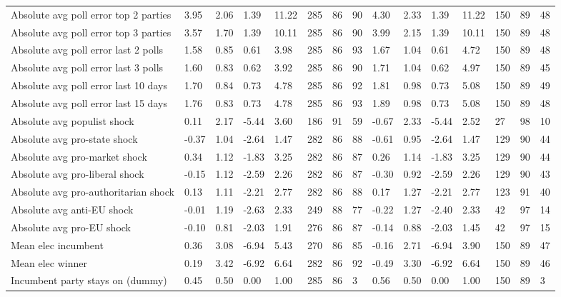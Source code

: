 \begin{longtable}{lllllllllllllll}
Absolute avg poll error top 2 parties & 3.95 & 2.06 & 1.39 & 11.22 & 285 & 86 & 90 & 4.30 & 2.33 & 1.39 & 11.22 & 150 & 89 & 48\\
Absolute avg poll error top 3 parties & 3.57 & 1.70 & 1.39 & 10.11 & 285 & 86 & 90 & 3.99 & 2.15 & 1.39 & 10.11 & 150 & 89 & 48\\
Absolute avg poll error last 2 polls & 1.58 & 0.85 & 0.61 & 3.98 & 285 & 86 & 93 & 1.67 & 1.04 & 0.61 & 4.72 & 150 & 89 & 48\\
\addlinespace
Absolute avg poll error last 3 polls & 1.60 & 0.83 & 0.62 & 3.92 & 285 & 86 & 90 & 1.71 & 1.04 & 0.62 & 4.97 & 150 & 89 & 45\\
Absolute avg poll error last 10 days & 1.70 & 0.84 & 0.73 & 4.78 & 285 & 86 & 92 & 1.81 & 0.98 & 0.73 & 5.08 & 150 & 89 & 49\\
Absolute avg poll error last 15 days & 1.76 & 0.83 & 0.73 & 4.78 & 285 & 86 & 93 & 1.89 & 0.98 & 0.73 & 5.08 & 150 & 89 & 48\\
Absolute avg populist shock & 0.11 & 2.17 & -5.44 & 3.60 & 186 & 91 & 59 & -0.67 & 2.33 & -5.44 & 2.52 & 27 & 98 & 10\\
Absolute avg pro-state shock & -0.37 & 1.04 & -2.64 & 1.47 & 282 & 86 & 88 & -0.61 & 0.95 & -2.64 & 1.47 & 129 & 90 & 44\\
\addlinespace
Absolute avg pro-market shock & 0.34 & 1.12 & -1.83 & 3.25 & 282 & 86 & 87 & 0.26 & 1.14 & -1.83 & 3.25 & 129 & 90 & 44\\
Absolute avg pro-liberal shock & -0.15 & 1.12 & -2.59 & 2.26 & 282 & 86 & 87 & -0.30 & 0.92 & -2.59 & 2.26 & 129 & 90 & 43\\
Absolute avg pro-authoritarian shock & 0.13 & 1.11 & -2.21 & 2.77 & 282 & 86 & 88 & 0.17 & 1.27 & -2.21 & 2.77 & 123 & 91 & 40\\
Absolute avg anti-EU shock & -0.01 & 1.19 & -2.63 & 2.33 & 249 & 88 & 77 & -0.22 & 1.27 & -2.40 & 2.33 & 42 & 97 & 14\\
Absolute avg pro-EU shock & -0.10 & 0.81 & -2.03 & 1.91 & 276 & 86 & 87 & -0.14 & 0.88 & -2.03 & 1.45 & 42 & 97 & 15\\
\addlinespace
Mean elec incumbent & 0.36 & 3.08 & -6.94 & 5.43 & 270 & 86 & 85 & -0.16 & 2.71 & -6.94 & 3.90 & 150 & 89 & 47\\
Mean elec winner & 0.19 & 3.42 & -6.92 & 6.64 & 282 & 86 & 92 & -0.49 & 3.30 & -6.92 & 6.64 & 150 & 89 & 46\\
Incumbent party stays on (dummy) & 0.45 & 0.50 & 0.00 & 1.00 & 285 & 86 & 3 & 0.56 & 0.50 & 0.00 & 1.00 & 150 & 89 & 3\\

\end{longtable}
